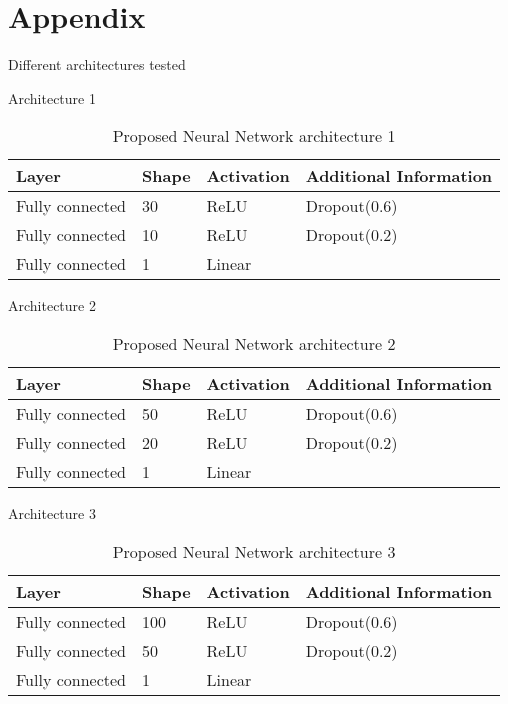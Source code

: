 \section{Appendix}
\label{sec:appendices}


Different architectures tested

Architecture 1

\begin{table}[!htb]
\centering
\begin{tabular}{l l l l}
	\hline
	Layer & Shape & Activation & Additional Information\\
  	\hline
  	Fully connected & 30 & ReLU & Dropout(0.6)\\
  	Fully connected & 10 & ReLU & Dropout(0.2)\\
  	Fully connected & 1 & Linear & \\
  	\hline
\end{tabular}
\caption{Proposed Neural Network architecture 1}
\label{table:proposed_nn_1}
\end{table}

Architecture 2

\begin{table}[!htb]
\centering
\begin{tabular}{l l l l}
	\hline
	Layer & Shape & Activation & Additional Information\\
  	\hline
  	Fully connected & 50 & ReLU & Dropout(0.6)\\
  	Fully connected & 20 & ReLU & Dropout(0.2)\\
  	Fully connected & 1 & Linear & \\
  	\hline
\end{tabular}
\caption{Proposed Neural Network architecture 2}
\label{table:proposed_nn_2}
\end{table}

Architecture 3

\begin{table}[!htb]
\centering
\begin{tabular}{l l l l}
	\hline
	Layer & Shape & Activation & Additional Information\\
  	\hline
  	Fully connected & 100 & ReLU & Dropout(0.6)\\
  	Fully connected & 50 & ReLU & Dropout(0.2)\\
  	Fully connected & 1 & Linear & \\
  	\hline
\end{tabular}
\caption{Proposed Neural Network architecture 3}
\label{table:proposed_nn_3}
\end{table}


